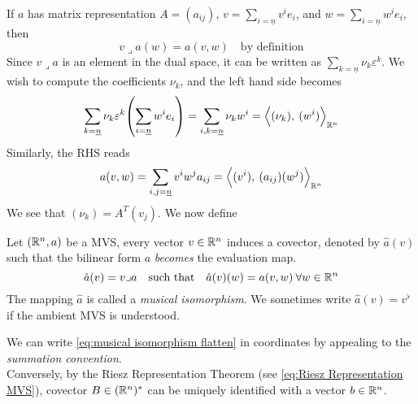 \documentclass[../main-v2-manifolds.tex]{subfiles}
\begin{document}
If $a$ has matrix representation $A = (a_{ij})$, $v = \sum_{i=\underline{n}} v^i e_i$, and $w = \sum_{i=\underline{n}} w^i e_i$, then
\[
    v\lrcorner a(w) = a(v,w)\quad\text{by definition}
\]
Since $v\lrcorner a$ is an element in the dual space, it can be written as $\sum_{k=\underline{n}}\nu_k \varepsilon^k$. We wish to compute the coefficients $\nu_k$, and the left hand side becomes
\[
    \sum_{k=\underline{n}}\nu_k\varepsilon^k\qty(\sum_{i=\underline{n}}w^ie_i) = \sum_{i,k=\underline{n}}\nu_kw^i = \Big\langle {(\nu_k)},\: {(w^i)} \Big\rangle_{{\mathbb{R}^n}}
\]
Similarly, the RHS reads
\[
    a(v,w)=\sum_{i,j=\underline{n}} v^iw^ja_{ij} = \Big\langle {(v^i)},\: {(a_{ij})(w^j)} \Big\rangle_{{\mathbb{R}^n}}
\]
We see that $(\nu_k) = A^T (v_j)$. We now define
\begin{definition}
    Let $({\mathbb{R}^n},a)$ be a MVS, every vector $v\in {\mathbb{R}^n}$ induces a covector, denoted by $\hat{a}(v)$ such that the bilinear form $a$ \emph{becomes} the evaluation map.
    \begin{equation}
        \hat{a}(v) = v\lrcorner a\qqtext{such that}\hat{a}(v)(w) = a(v,w)\:\forall w\in \realn
        \label{eq:musical isomorphism flatten}
    \end{equation}
    The mapping $\hat{a}$ is called a \emph{musical isomorphism}. We sometimes write $\hat{a}(v) = v^{\flat}$ if the ambient MVS is understood.
\end{definition}

We can write \cref{eq:musical isomorphism flatten} in coordinates by appealing to the \emph{summation convention}. \\


Conversely, by the Riesz Representation Theorem (see \cref{eq:Riesz Representation MVS}), covector $B\in({\mathbb{R}^n})^*$ can be uniquely identified with a vector $b\in{\mathbb{R}^n}$.\\
\end{document}
